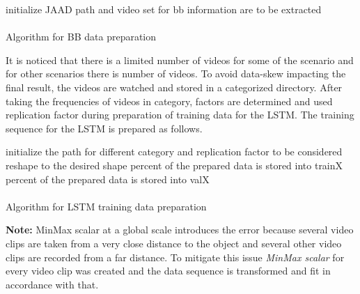 \begin{algorithm}[H]
\SetAlgoLined
{}
 initialize JAAD path and video set for bb information are to be extracted \;
~\\
~\\
 \caption{Algorithm for BB data preparation}
\end{algorithm}

It is noticed that there is a limited number of videos for some of the scenario and for other scenarios there is number of videos. To avoid data-skew impacting the final result, the videos are watched and stored in a categorized directory. After taking the frequencies of videos in category, factors are determined  and used  replication factor during preparation of training data for the LSTM. The training sequence for the LSTM is prepared as follows.

\begin{algorithm}[H]
\SetAlgoLined
{}
 initialize the path for different category and replication factor to be considered \;
reshape to the desired shape percent of the prepared data is stored into train\textunderscore X percent of the prepared data is stored into val\textunderscore X\; 
~\\
~\\
 \caption{Algorithm for LSTM training data preparation}
\end{algorithm}

\textbf{Note:} MinMax scalar at a global scale introduces the error because several video clips are taken from a very close distance to the object and several other video clips are recorded from a far distance. To mitigate this issue \textit{MinMax scalar } for every video clip was created and the data sequence is transformed and fit in accordance with that.

